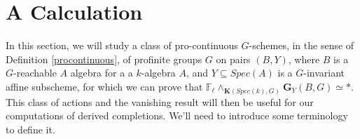 \documentclass[11pt]{article}
\newcommand\mb{\mathbb}
\def \bK{\mathbf K}
\newcommand\mfk{\mathbf G}
\begin{document}
      
      
  



 

 


 \section{A Calculation} \label{Calculation}

 In this section, we will study a class of pro-continuous $G$-schemes, in the sense of Definition \ref{procontinuous},  of profinite groups $G$ on pairs $(B,Y)$, where $B$ is a $G$-reachable $A$ algebra for a a $k$-algebra $A$, and $Y \subseteq Spec(A)$ is a $G$-invariant  affine  subscheme, for which we can prove that $\mb{F}_{\ell} \wedge _{\bK(Spec(k),G)}\mfk_{ Y}(B, G)  \simeq *$.  This class of actions and the  vanishing result  will then be useful for our computations of derived completions.  We'll need to introduce some terminology to define it.  
\end{document}
